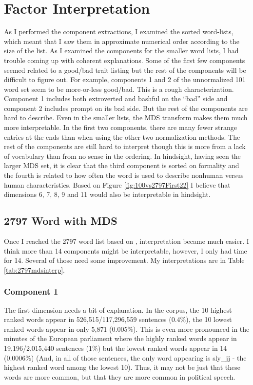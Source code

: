 \chapter{Factor Interpretation}

As I performed the component extractions, I examined the sorted word-lists, 
which meant that I saw them in approximate numerical order according to the size 
of the list. As I examined the components for the smaller word lists, I had 
trouble coming up with coherent explanations. Some of the first few components 
seemed related to a good/bad trait listing but the rest of the components will 
be difficult to figure out. For example, components 1 and 2 of the unnormalized 
101 word set seem to be more-or-less good/bad. This is a rough characterization. 
Component 1 includes both extroverted and bashful on the ``bad'' side and 
component 2 includes prompt on its bad side. But the rest of the components are 
hard to describe. Even in the smaller lists, the MDS transform makes them much 
more interpretable. In the first two components, there are many fewer strange 
entries at the ends than when using the other two normalization methods. The 
rest of the components are still hard to interpret though this is more from a 
lack of vocabulary than from no sense in the ordering. In hindsight, having seen 
the larger MDS set, it is clear that the third component is sorted on formality 
and the fourth is related to how often the word is used to describe nonhuman 
versus human characteristics. Based on Figure 
\ref{fig:100vs2797First22} I believe that dimensions 6, 7, 8, 9 and 11
would also be interpretable in hindsight.

\section{2797 Word with MDS}

Once I reached the 2797 word list based on \citep{Norman1967}, interpretation 
became much easier. I think more than 14 components might be interpretable, 
however, I only had time for 14. Several of those need some improvement. 
My interpretations are in Table
\ref{tab:2797mdsinterp}.

\subsection{Component 1}

The first dimension needs a bit of explanation. In the corpus, the 10 highest 
ranked words appear in 526,515/117,296,559 sentences (0.4\%), the 10 lowest 
ranked words appear in only 5,871 (0.005\%). This is even more pronounced in the 
minutes of the European parliament where the highly ranked words appear in 
19,196/2,015,440 sentences (1\%) but the lowest ranked words appear in 14 
(0.0006\%) (And, in all of those sentences, the only word appearing is 
sly\_jj - the highest ranked word among the lowest 10). Thus, it may not be 
just that these words are more common, but that they are more common in 
political speech.

